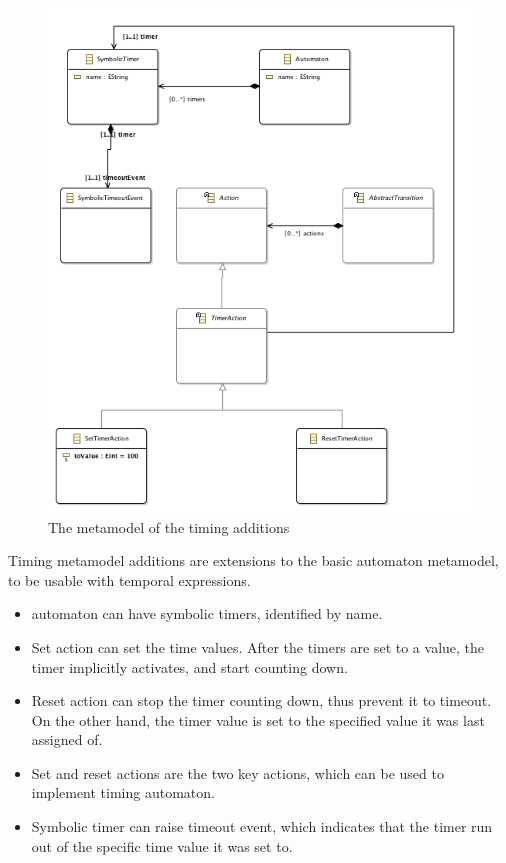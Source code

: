 \begin{figure}[h]
	\centering
	\includegraphics[width = \textwidth]{include/figures/timing_diagram}
	\caption{The \emf{} metamodel of the \viatrac{} timing additions}
\label{fig:timed_automaton}
\end{figure}

Timing metamodel additions are extensions to the basic automaton metamodel, to be usable with temporal expressions.
\begin{itemize}
	\item automaton can have symbolic timers, identified by name.
	\item Set action can set the time values. After the timers are set to a value, the timer implicitly activates, and start counting down.
	\item Reset action can stop the timer counting down, thus prevent it to timeout. On the other hand, the timer value is set to the specified value it was last assigned of.
	\item Set and reset actions are the two key actions, which can be used to implement timing automaton.
	\item Symbolic timer can raise timeout event, which indicates that the timer run out of the specific time value it was set to.
\end{itemize}

